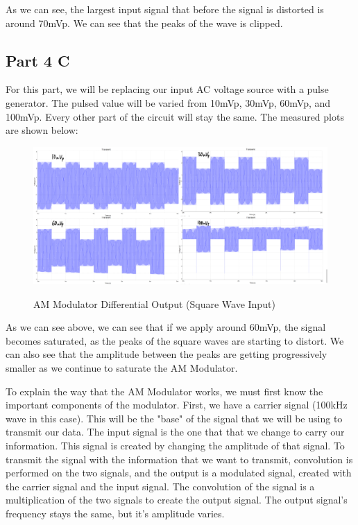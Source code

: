 \documentclass[12pt]{article}
\begin{document}
As we can see, the largest input signal that before the signal is distorted is around 70mVp. We can see that the peaks of the wave is clipped.
\subsection{Part 4 C}

For this part, we will be replacing our input AC voltage source with a pulse generator. The pulsed value will be varied from 10mVp, 30mVp, 60mVp, and 100mVp. Every other part of the circuit will stay the same. The measured plots are shown below:

\begin{figure}[h!]
\centering
\includegraphics[height=0.4\textwidth]{Images/part_4_voltagesq.png}\\
\caption{AM Modulator Differential Output (Square Wave Input)}
\label{fig:Differential Output}
\end{figure}
\FloatBarrier

As we can see above, we can see that if we apply around 60mVp, the signal becomes saturated, as the peaks of the square waves are starting to distort. We can also see that the amplitude between the peaks are getting progressively smaller as we continue to saturate the AM Modulator. 

To explain the way that the AM Modulator works, we must first know the important components of the modulator. First, we have a carrier signal (100kHz wave in this case). This will be the "base" of the signal that we will be using to transmit our data. The input signal is the one that that we change to carry our information. This signal is created by changing the amplitude of that signal. To transmit the signal with the information that we want to transmit, convolution is performed on the two signals, and the output is a modulated signal, created with the carrier signal and the input signal. The convolution of the signal is a multiplication of the two signals to create the output signal. The output signal's frequency stays the same, but it's amplitude varies.
\vbox{}
\vbox{}
\vbox{}
\vbox{}
\vbox{}
\vbox{}
\vbox{}
\vbox{}
\vbox{}
\vbox{}
\vbox{}
\end{document}
